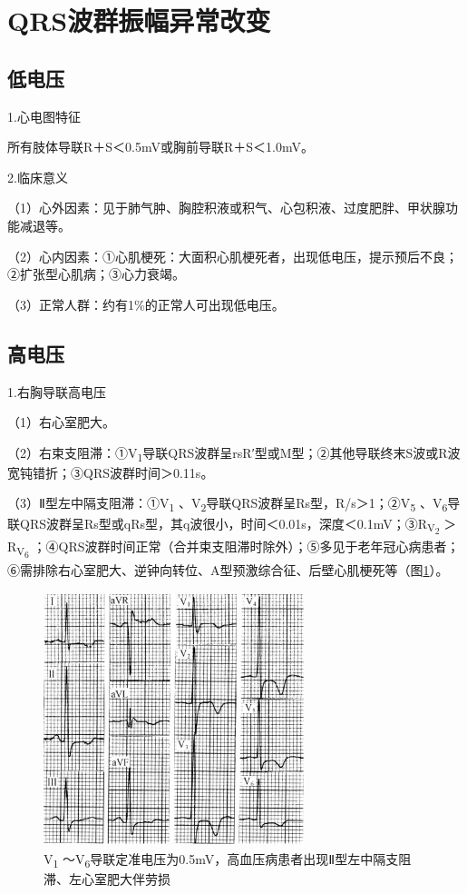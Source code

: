 \section{QRS波群振幅异常改变}

\protect\hypertarget{text00009.htmlux5cux23subid39}{}{}

\subsection{低电压}

1.心电图特征

所有肢体导联R＋S＜0.5mV或胸前导联R＋S＜1.0mV。

2.临床意义

（1）心外因素：见于肺气肿、胸腔积液或积气、心包积液、过度肥胖、甲状腺功能减退等。

（2）心内因素：①心肌梗死：大面积心肌梗死者，出现低电压，提示预后不良；②扩张型心肌病；③心力衰竭。

（3）正常人群：约有1\%的正常人可出现低电压。

\protect\hypertarget{text00009.htmlux5cux23subid40}{}{}

\subsection{高电压}

1.右胸导联高电压

（1）右心室肥大。

（2）右束支阻滞：①V\textsubscript{1}导联QRS波群呈rsR′型或M型；②其他导联终末S波或R波宽钝错折；③QRS波群时间＞0.11s。

（3）Ⅱ型左中隔支阻滞：①V\textsubscript{1} 、V\textsubscript{2}导联QRS波群呈Rs型，R/s＞1；②V\textsubscript{5} 、V\textsubscript{6}导联QRS波群呈Rs型或qRs型，其q波很小，时间＜0.01s，深度＜0.1mV；③R\textsubscript{V\textsubscript{2}}
＞R\textsubscript{V\textsubscript{6}}
；④QRS波群时间正常（合并束支阻滞时除外）；⑤多见于老年冠心病患者；⑥需排除右心室肥大、逆钟向转位、A型预激综合征、后壁心肌梗死等（图\ref{fig3-1}）。

\begin{figure}[!htbp]
 \centering
 \includegraphics[width=2.98958in,height=2.91667in]{./images/Image00050.jpg}
 \captionsetup{justification=centering}
 \caption{V\textsubscript{1} ～V\textsubscript{6}导联定准电压为0.5mV，高血压病患者出现Ⅱ型左中隔支阻滞、左心室肥大伴劳损}
 \label{fig3-1}
  \end{figure} 


